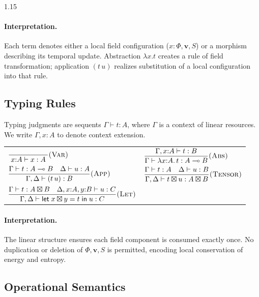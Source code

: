 \documentclass[12pt,a4paper]{article}
\begin{document}
\begin{spacing}{1.15}
\paragraph{Interpretation.}
Each term denotes either a local field configuration
($x{:}\Phi,\mathbf{v},S$) or a morphism describing its temporal update.
Abstraction $\lambda x.t$ creates a rule of field transformation;
application $(t\,u)$ realizes substitution of a local configuration
into that rule.

\subsection{Typing Rules}

Typing judgments are sequents $\Gamma \vdash t : A$,
where $\Gamma$ is a context of linear resources.
We write $\Gamma,x{:}A$ to denote context extension.

\begin{center}
\renewcommand{\arraystretch}{1.4}
\begin{tabular}{ll}
\(\displaystyle
\frac{}{\;x{:}A \vdash x : A\;} \textsc{(Var)}\)
&
\(\displaystyle
\frac{\Gamma,x{:}A \vdash t:B}{\Gamma \vdash \lambda x{:}A.\,t : A \multimap B} \textsc{(Abs)}\)
\\[1em]
\(\displaystyle
\frac{\Gamma \vdash t:A\multimap B \quad \Delta \vdash u:A}
     {\Gamma,\Delta \vdash (t\,u):B} \textsc{(App)}\)
&
\(\displaystyle
\frac{\Gamma \vdash t:A \quad \Delta \vdash u:B}
     {\Gamma,\Delta \vdash t\boxtimes u : A\boxtimes B} \textsc{(Tensor)}\)
\\[1em]
\(\displaystyle
\frac{\Gamma \vdash t:A\boxtimes B \quad \Delta,x{:}A,y{:}B \vdash u:C}
     {\Gamma,\Delta \vdash \mathsf{let}\;x\boxtimes y=t\;\mathsf{in}\;u : C} \textsc{(Let)}\)
\end{tabular}
\end{center}

\paragraph{Interpretation.}
The linear structure ensures each field component is consumed exactly once.
No duplication or deletion of $\Phi,\mathbf{v},S$ is permitted,
encoding local conservation of energy and entropy.

\subsection{Operational Semantics}


\end{spacing}
\end{document}
